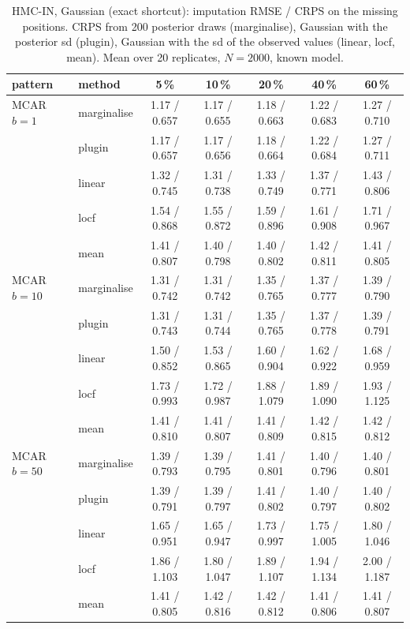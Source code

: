 \begin{table}[htbp]
  \centering
  \small
  \setlength{\tabcolsep}{4pt}
  \caption{HMC-IN, Gaussian (exact shortcut): imputation RMSE / CRPS on the missing positions. CRPS from 200 posterior draws (marginalise), Gaussian with the posterior sd (plugin), Gaussian with the sd of the observed values (linear, locf, mean). Mean over 20 replicates, $N = 2000$, known model.}
  \label{tab:missing-imp-hmc_in_gauss_k2}
  \begin{tabular}{llccccc}
    \toprule
    pattern & method & 5\,\% & 10\,\% & 20\,\% & 40\,\% & 60\,\% \\
    \midrule
    MCAR $b{=}1$ & marginalise & 1.17 / 0.657 & 1.17 / 0.655 & 1.18 / 0.663 & 1.22 / 0.683 & 1.27 / 0.710 \\
     & plugin & 1.17 / 0.657 & 1.17 / 0.656 & 1.18 / 0.664 & 1.22 / 0.684 & 1.27 / 0.711 \\
     & linear & 1.32 / 0.745 & 1.31 / 0.738 & 1.33 / 0.749 & 1.37 / 0.771 & 1.43 / 0.806 \\
     & locf & 1.54 / 0.868 & 1.55 / 0.872 & 1.59 / 0.896 & 1.61 / 0.908 & 1.71 / 0.967 \\
     & mean & 1.41 / 0.807 & 1.40 / 0.798 & 1.40 / 0.802 & 1.42 / 0.811 & 1.41 / 0.805 \\
    \addlinespace
    MCAR $b{=}10$ & marginalise & 1.31 / 0.742 & 1.31 / 0.742 & 1.35 / 0.765 & 1.37 / 0.777 & 1.39 / 0.790 \\
     & plugin & 1.31 / 0.743 & 1.31 / 0.744 & 1.35 / 0.765 & 1.37 / 0.778 & 1.39 / 0.791 \\
     & linear & 1.50 / 0.852 & 1.53 / 0.865 & 1.60 / 0.904 & 1.62 / 0.922 & 1.68 / 0.959 \\
     & locf & 1.73 / 0.993 & 1.72 / 0.987 & 1.88 / 1.079 & 1.89 / 1.090 & 1.93 / 1.125 \\
     & mean & 1.41 / 0.810 & 1.41 / 0.807 & 1.41 / 0.809 & 1.42 / 0.815 & 1.42 / 0.812 \\
    \addlinespace
    MCAR $b{=}50$ & marginalise & 1.39 / 0.793 & 1.39 / 0.795 & 1.41 / 0.801 & 1.40 / 0.796 & 1.40 / 0.801 \\
     & plugin & 1.39 / 0.791 & 1.39 / 0.797 & 1.41 / 0.802 & 1.40 / 0.797 & 1.40 / 0.802 \\
     & linear & 1.65 / 0.951 & 1.65 / 0.947 & 1.73 / 0.997 & 1.75 / 1.005 & 1.80 / 1.046 \\
     & locf & 1.86 / 1.103 & 1.80 / 1.047 & 1.89 / 1.107 & 1.94 / 1.134 & 2.00 / 1.187 \\
     & mean & 1.41 / 0.805 & 1.42 / 0.816 & 1.42 / 0.812 & 1.41 / 0.806 & 1.41 / 0.807 \\

\end{tabular}
\end{table}
